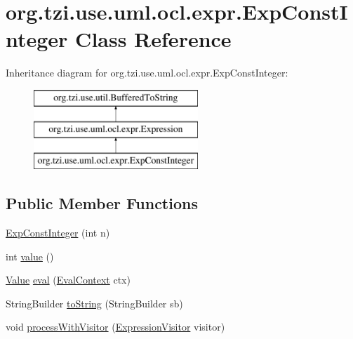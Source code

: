 \hypertarget{classorg_1_1tzi_1_1use_1_1uml_1_1ocl_1_1expr_1_1_exp_const_integer}{\section{org.\-tzi.\-use.\-uml.\-ocl.\-expr.\-Exp\-Const\-Integer Class Reference}
\label{classorg_1_1tzi_1_1use_1_1uml_1_1ocl_1_1expr_1_1_exp_const_integer}
}
Inheritance diagram for org.\-tzi.\-use.\-uml.\-ocl.\-expr.\-Exp\-Const\-Integer\-:\begin{figure}[H]
\begin{center}
\leavevmode
\includegraphics[height=3.000000cm]{classorg_1_1tzi_1_1use_1_1uml_1_1ocl_1_1expr_1_1_exp_const_integer}
\end{center}
\end{figure}
\subsection*{Public Member Functions}
\begin{DoxyCompactItemize}
\item 
\hyperlink{classorg_1_1tzi_1_1use_1_1uml_1_1ocl_1_1expr_1_1_exp_const_integer_a280c305e8939eeeedee56ad899627398}{Exp\-Const\-Integer} (int n)
\item 
int \hyperlink{classorg_1_1tzi_1_1use_1_1uml_1_1ocl_1_1expr_1_1_exp_const_integer_ad3df5ade64ca69245fa431764f924341}{value} ()
\item 
\hyperlink{classorg_1_1tzi_1_1use_1_1uml_1_1ocl_1_1value_1_1_value}{Value} \hyperlink{classorg_1_1tzi_1_1use_1_1uml_1_1ocl_1_1expr_1_1_exp_const_integer_ac5c44e721ac454e9d8b691cec53dba82}{eval} (\hyperlink{classorg_1_1tzi_1_1use_1_1uml_1_1ocl_1_1expr_1_1_eval_context}{Eval\-Context} ctx)
\item 
String\-Builder \hyperlink{classorg_1_1tzi_1_1use_1_1uml_1_1ocl_1_1expr_1_1_exp_const_integer_ab4daf1757bf20a4c3a4db2e0b8ff85c7}{to\-String} (String\-Builder sb)
\item 
void \hyperlink{classorg_1_1tzi_1_1use_1_1uml_1_1ocl_1_1expr_1_1_exp_const_integer_ae1c74616ef3a1a7b65f4d2b25bdd896e}{process\-With\-Visitor} (\hyperlink{interfaceorg_1_1tzi_1_1use_1_1uml_1_1ocl_1_1expr_1_1_expression_visitor}{Expression\-Visitor} visitor)
\end{DoxyCompactItemize}
